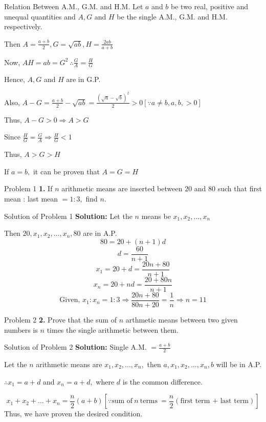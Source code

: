 \documentclass[aspectratio=1610,8pt]{beamer}
\begin{document}
\begin{frame}{Relation Between A.M., G.M. and H.M.}
  Let $a$ and $b$ be two real, positive and unequal quantities and $A, G$ and
  $H$ be the single A.M., G.M. and H.M. respectively.

  Then $A = \frac{a + b}{2}, G = \sqrt{ab}, H = \frac{2ab}{a + b}$

  Now, $AH = ab = G^2~\therefore \frac{G}{A} = \frac{H}{G}$

  Hence, $A, G$ and $H$ are in G.P.

  Also, $A - G = \frac{a + b}{2} - \sqrt{ab} = \frac{(\sqrt{a} -
    \sqrt{b})^2}{2} > 0[\because a\neq b, a, b, > 0]$

  Thus, $A - G > 0 \Rightarrow A > G$

  Since $\frac{H}{G} = \frac{G}{A} \Rightarrow \frac{H}{G} < 1$

  Thus, $A > G > H$

  If $a = b,$ it can be proven that $A = G = H$
\end{frame}
\begin{frame}{Problem 1}
  \textbf{1.} If $n$ arithmetic means are inserted between $20$ and $80$ such
  that first mean : last mean $= 1 : 3,$ find $n.$
\end{frame}
\begin{frame}{Solution of Problem 1}
  \textbf{Solution:} Let the $n$ means be $x_1, x_2, \ldots, x_n$

  Then $20, x_1, x_2,\ldots, x_n, 80$ are in A.P.
  $$80 = 20 + (n + 1)d$$
  $$d = \frac{60}{n + 1}$$
  $$x_1 = 20 + d = \frac{20n + 80}{n + 1}$$
  $$x_n = 20 + nd = \frac{20 + 80n}{n + 1}$$
  $$\text{Given,~}x_1:x_n = 1:3 \Rightarrow \frac{20n + 80}{80n + 20} =
  \frac{1}{n} \Rightarrow n = 11$$
\end{frame}
\begin{frame}{Problem 2}
  \textbf{2.} Prove that the sum of $n$ arthmetic means between two given
  numbers is $n$ times the single arithmetic between them.
\end{frame}
\begin{frame}{Solution of Problem 2}
  \textbf{Solution:} Single A.M. $= \frac{a + b}{2}$

  Let the $n$ arithmetic means are $x_1, x_2, \ldots, x_n,$ then $a, x_1, x_2,
  \ldots, x_n, b$ will be in A.P.

  $\therefore x_1 = a + d$ and $x_n = a + d,$ where $d$ is the common
  difference.

  $$x_1 + x_2 + \ldots + x_n = \frac{n}{2}(a + b)[\because \text{sum
      of}~n~\text{terms}~= \frac{n}{2}(\text{first term + last term})]$$
  Thus, we have proven the desired condition.
\end{frame}
\end{document}
